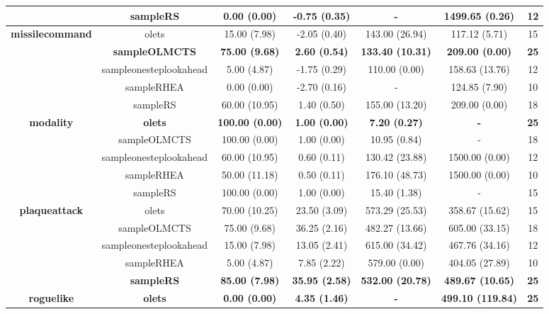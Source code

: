 \begin{table*}[!t]
\begin{center}
\begin{adjustbox}{width=1\textwidth}
\begin{tabular}{|c|c|c|c|c|c|c|}
\cline{2-7}
 & sampleRS & 0.00 (0.00) & -0.75 (0.35) &  -  & 1499.65 (0.26) & 12
 \\
\hline
\hline
\cline{2-7}
\multirow{5}{*}{\textbf{missilecommand}} & olets & 15.00 (7.98) & -2.05 (0.40) & 143.00 (26.94) & 117.12 (5.71) & 15
 \\
\cline{2-7}
 & \textbf{sampleOLMCTS} & \textbf{75.00 (9.68)} & \textbf{2.60 (0.54)} & \textbf{133.40 (10.31)} & \textbf{209.00 (0.00)} & \textbf{25}
 \\
\cline{2-7}
 & sampleonesteplookahead & 5.00 (4.87) & -1.75 (0.29) & 110.00 (0.00) & 158.63 (13.76) & 12
 \\
\cline{2-7}
 & sampleRHEA & 0.00 (0.00) & -2.70 (0.16) &  -  & 124.85 (7.90) & 10
 \\
\cline{2-7}
 & sampleRS & 60.00 (10.95) & 1.40 (0.50) & 155.00 (13.20) & 209.00 (0.00) & 18
 \\
\hline
\hline
\cline{2-7}
\multirow{5}{*}{\textbf{modality}} & \textbf{olets} & \textbf{100.00 (0.00)} & \textbf{1.00 (0.00)} & \textbf{7.20 (0.27)} & \textbf{ - } & \textbf{25}
 \\
\cline{2-7}
 & sampleOLMCTS & 100.00 (0.00) & 1.00 (0.00) & 10.95 (0.84) &  -  & 18
 \\
\cline{2-7}
 & sampleonesteplookahead & 60.00 (10.95) & 0.60 (0.11) & 130.42 (23.88) & 1500.00 (0.00) & 12
 \\
\cline{2-7}
 & sampleRHEA & 50.00 (11.18) & 0.50 (0.11) & 176.10 (48.73) & 1500.00 (0.00) & 10
 \\
\cline{2-7}
 & sampleRS & 100.00 (0.00) & 1.00 (0.00) & 15.40 (1.38) &  -  & 15
 \\
\hline
\hline
\cline{2-7}
\multirow{5}{*}{\textbf{plaqueattack}} & olets & 70.00 (10.25) & 23.50 (3.09) & 573.29 (25.53) & 358.67 (15.62) & 15
 \\
\cline{2-7}
 & sampleOLMCTS & 75.00 (9.68) & 36.25 (2.16) & 482.27 (13.66) & 605.00 (33.15) & 18
 \\
\cline{2-7}
 & sampleonesteplookahead & 15.00 (7.98) & 13.05 (2.41) & 615.00 (34.42) & 467.76 (34.16) & 12
 \\
\cline{2-7}
 & sampleRHEA & 5.00 (4.87) & 7.85 (2.22) & 579.00 (0.00) & 404.05 (27.89) & 10
 \\
\cline{2-7}
 & \textbf{sampleRS} & \textbf{85.00 (7.98)} & \textbf{35.95 (2.58)} & \textbf{532.00 (20.78)} & \textbf{489.67 (10.65)} & \textbf{25}
 \\
\hline
\hline
\cline{2-7}
\multirow{5}{*}{\textbf{roguelike}} & \textbf{olets} & \textbf{0.00 (0.00)} & \textbf{4.35 (1.46)} & \textbf{ - } & \textbf{499.10 (119.84)} & \textbf{25}

\end{tabular}
\end{adjustbox}
\end{center}
\end{table*}
